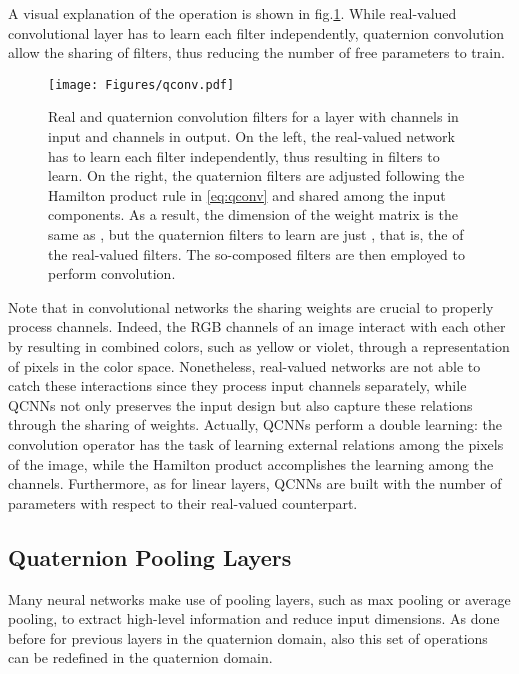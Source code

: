 \documentclass[graybox]{svmult}
\begin{document}
\noindent A visual explanation of the operation is shown in fig.\ref{fig:qconv}. While real-valued convolutional layer has to learn each filter independently, quaternion convolution allow the sharing of filters, thus reducing the number of free parameters to train.

\begin{figure}
    \centering
    \texttt{[image: Figures/qconv.pdf]}
    \caption{Real and quaternion convolution filters for a layer  with  channels in input and  channels in output. On the left, the real-valued network has to learn each filter independently, thus resulting in  filters to learn. On the right, the quaternion filters are adjusted following the Hamilton product rule in \eqref{eq:qconv} and shared among the  input components. As a result, the dimension of the weight matrix  is the same as , but the quaternion filters to learn are just , that is, the  of the real-valued filters. The so-composed filters are then employed to perform convolution.}
    \label{fig:qconv}
\end{figure}

Note that in convolutional networks the sharing weights are crucial to properly process channels. Indeed, the RGB channels of an image interact with each other by resulting in combined colors, such as yellow or violet, through a representation of pixels in the color space. Nonetheless, real-valued networks are not able to catch these interactions since they process input channels separately, while QCNNs not only preserves the input design but also capture these relations through the sharing of weights.
Actually, QCNNs perform a double learning: the convolution operator has the task of learning external relations among the pixels of the image, while the Hamilton product accomplishes the learning among the channels.
Furthermore, as for linear layers, QCNNs are built with  the number of parameters with respect to their real-valued counterpart.

\subsection{Quaternion Pooling Layers}
\noindent Many neural networks make use of pooling layers, such as max pooling or average pooling, to extract high-level information and reduce input dimensions. As done before for previous layers in the quaternion domain, also this set of operations can be redefined in the quaternion domain.
\end{document}
